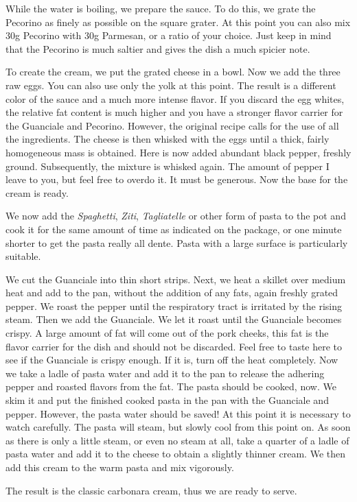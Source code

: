 While the water is boiling, we prepare the sauce. To do this, we grate the Pecorino as finely as possible on the square grater. At this point you can also mix $30$g Pecorino with $30$g Parmesan, or a ratio of your choice. Just keep in mind that the Pecorino is much saltier and gives the dish a much spicier note. 

To create the cream, we put the grated cheese in a bowl. Now we add the three raw eggs. You can also use only the yolk at this point. The result is a different color of the sauce and a much more intense flavor. If you discard the egg whites, the relative fat content is much higher and you have a stronger flavor carrier for the Guanciale and Pecorino. However, the original recipe calls for the use of all the ingredients. The cheese is then whisked with the eggs until a thick, fairly homogeneous mass is obtained. Here is now added abundant black pepper, freshly ground. Subsequently, the mixture is whisked again. The amount of pepper I leave to you, but feel free to overdo it. It must be generous. Now the base for the cream is ready.

We now add the \emph{Spaghetti}, \emph{Ziti}, \emph{Tagliatelle} or other form of pasta to the pot and cook it for the same amount of time as indicated on the package, or one minute shorter to get the pasta really all dente. Pasta with a large surface is particularly suitable.

We cut the Guanciale into thin short strips. Next, we heat a skillet over medium heat and add to the pan, without the addition of any fats, again freshly grated pepper. We roast the pepper until the respiratory tract is irritated by the rising steam. Then we add the Guanciale. We let it roast until the Guanciale becomes crispy. A large amount of fat will come out of the pork cheeks, this fat is the flavor carrier for the dish and should not be discarded. Feel free to taste here to see if the Guanciale is crispy enough. If it is, turn off the heat completely. Now we take a ladle of pasta water and add it to the pan to release the adhering pepper and roasted flavors from the fat. The pasta should be cooked, now. We skim it and put the finished cooked pasta in the pan with the Guanciale and pepper. However, the pasta water should be saved! At this point it is necessary to watch carefully. The pasta will steam, but slowly cool from this point on. As soon as there is only a little steam, or even no steam at all, take a quarter of a ladle of pasta water and add it to the cheese to obtain a slightly thinner cream. We then add this cream to the warm pasta and mix vigorously.

The result is the classic carbonara cream, thus we are ready to serve.

